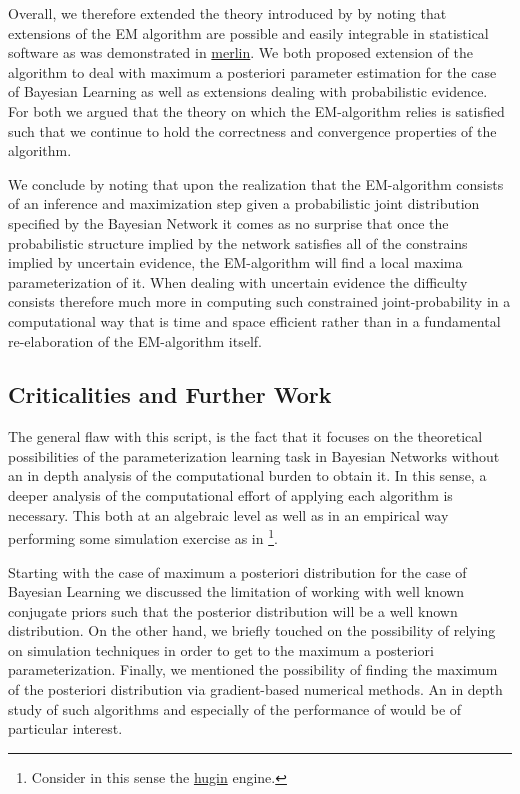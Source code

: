 \documentclass[11pt]{article}
\begin{document}
\begin{article}
Overall, we therefore extended the theory introduced by
\cite{Wasserkrug_all} by noting that extensions of the EM algorithm
are possible and easily integrable in statistical software as was
demonstrated in \href{https://github.com/radum2275/merlin}{merlin}. We both proposed extension of the algorithm
to deal with maximum a posteriori parameter estimation for the case
of Bayesian Learning as well as extensions dealing with
probabilistic evidence. For both we argued that the theory on which
the EM-algorithm relies is satisfied such that we continue to hold
the correctness and convergence properties of the algorithm.

We conclude by noting that upon the realization that the
EM-algorithm consists of an inference and maximization step given a probabilistic
joint distribution specified by the Bayesian Network it comes as no
surprise that once the probabilistic structure implied by the
network satisfies all of the constrains implied by uncertain
evidence, the EM-algorithm will find a local maxima parameterization
of it. When dealing with uncertain evidence the difficulty consists
therefore much more in computing such constrained joint-probability
in a computational way that is time and space efficient rather than
in a fundamental re-elaboration of the EM-algorithm itself.

\subsection{Criticalities and Further Work}
\label{sec:org3be55b0}

The general flaw with this script, is the fact that it focuses
on the theoretical possibilities of the parameterization learning
task in Bayesian Networks without an in depth analysis of the
computational burden to obtain it. In this sense, a deeper analysis
of the computational effort of applying each algorithm is
necessary. This both at an algebraic level as well as in an
empirical way performing some simulation exercise as in
\cite{Wasserkrug_all}\footnote{Consider in this sense the \href{https://www.hugin.com/}{hugin} engine.}.  

Starting with the case of maximum a posteriori distribution for the
case of Bayesian Learning we discussed the limitation of working
with well known conjugate priors such that the posterior
distribution will be a well known distribution. On the other hand,
we briefly touched on the possibility of relying on simulation
techniques in order to get to the maximum a posteriori
parameterization. Finally, we mentioned the possibility of finding
the maximum of the posteriori distribution via gradient-based
numerical methods. An in depth study of such algorithms and
especially of the performance of \cite{meng2016method} would be of
particular interest. 


\end{article}
\end{document}
